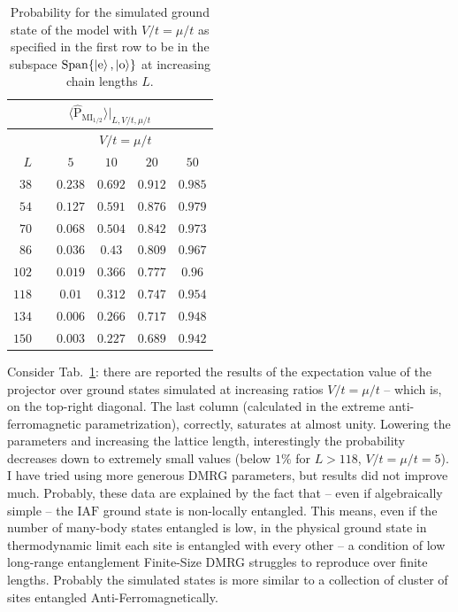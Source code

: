 \begin{table}
	\centering
	\begin{tabular}{r c c c c c}
		\multicolumn{6}{c}{$\langle \hat{\mathrm{P}}_{\mathrm{MI}_{1/2}} \rangle \Big|_{L,V/t,\mu/t}$} \\
		\toprule
		& \multicolumn{5}{c}{$V/t=\mu/t$}\\
		\cmidrule{3-6}
		$L$ && $5$ & $10$ & $20$ & $50$ \\
		\midrule
		$ 38 $ && $ 0.238 $ & $ 0.692 $ & $ 0.912 $ & $ 0.985 $ \\
		$ 54 $ && $ 0.127 $ & $ 0.591 $ & $ 0.876 $ & $ 0.979 $ \\
		$ 70 $ && $ 0.068 $ & $ 0.504 $ & $ 0.842 $ & $ 0.973 $ \\
		$ 86 $ && $ 0.036 $ & $ 0.43 $ & $ 0.809 $ & $ 0.967 $ \\
		$ 102 $ && $ 0.019 $ & $ 0.366 $ & $ 0.777 $ & $ 0.96 $ \\
		$ 118 $ && $ 0.01 $ & $ 0.312 $ & $ 0.747 $ & $ 0.954 $ \\
		$ 134 $ && $ 0.006 $ & $ 0.266 $ & $ 0.717 $ & $ 0.948 $ \\
		$ 150 $ && $ 0.003 $ & $ 0.227 $ & $ 0.689 $ & $ 0.942 $ \\
		\bottomrule
	\end{tabular}
	\caption{Probability for the simulated ground state of the model with $V/t = \mu/t$ as specified in the first row to be in the subspace $\mathrm{Span}\lbrace \ket{\mathrm{e}}, \ket{\mathrm{o}} \rbrace$ at increasing chain lengths $L$.}
	\label{tab:MI1/2-projections}
\end{table}

Consider Tab.~\ref{tab:MI1/2-projections}: there are reported the results of the expectation value of the projector over ground states simulated at increasing ratios $V/t = \mu/t$ -- which is, on the top-right diagonal. The last column (calculated in the extreme anti-ferromagnetic parametrization), correctly, saturates at almost unity. Lowering the parameters and increasing the lattice length, interestingly the probability decreases down to extremely small values (below $1\%$ for $L>118$, $V/t=\mu/t=5$). I have tried using more generous DMRG parameters, but results did not improve much. Probably, these data are explained by the fact that -- even if algebraically simple -- the $\mathrm{IAF}$ ground state is non-locally entangled. This means, even if the number of many-body states entangled is low, in the physical ground state in thermodynamic limit each site is entangled with every other -- a condition of low long-range entanglement Finite-Size DMRG struggles to reproduce over finite lengths. Probably the simulated states is more similar to a collection of cluster of sites entangled Anti-Ferromagnetically.

